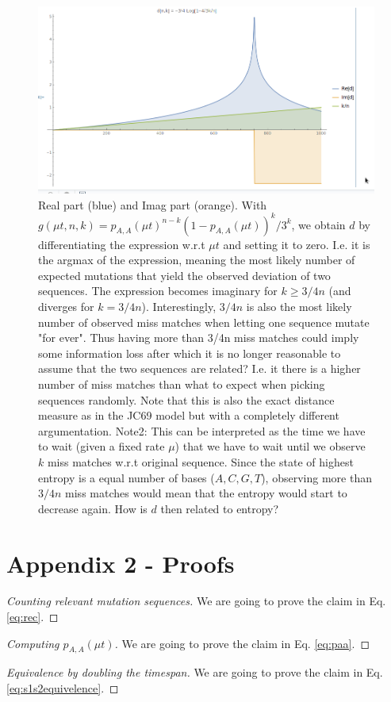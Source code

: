 \documentclass[12pt]{article}
\begin{document}
\begin{figure}
	\centering
	\includegraphics[width=1.0\linewidth]{Screenshot_20181205_140634}
	\caption{Real part (blue) and Imag part (orange). With $g(\mu t,n,k) = p_{A,A}(\mu t)^{n-k} (1-p_{A,A}(\mu t))^k/3^k$, we obtain $d$ by differentiating the expression w.r.t $\mu t$ and setting it to zero. I.e. it is the argmax of the expression, meaning the most likely number of expected mutations that yield the observed deviation of two sequences. The expression becomes imaginary for $k\geq 3/4n$ (and diverges for $k=3/4n$). Interestingly, $3/4n$ is also the most likely number of observed miss matches when letting one sequence mutate "for ever". Thus having more than 3/4n miss matches could imply some information loss after which it is no longer reasonable to assume that the two sequences are related? I.e. it there is a higher number of miss matches than what to expect when picking sequences randomly. {\color{red}Note that this is also the exact distance measure as in the JC69 model but with a completely different argumentation.}
	Note2: This can be interpreted as the time we have to wait (given a fixed rate $\mu$) that we have to wait until we observe $k$ miss matches w.r.t original sequence. Since the state of highest entropy is a equal number of bases ($A,C,G,T$), observing more than $3/4n$ miss matches would mean that the entropy would start to decrease again. How is $d$ then related to entropy? }
	\label{fig:distancemeasure}
\end{figure}
\FloatBarrier
\section{Appendix 2 - Proofs}
\begin{proof}[Counting relevant mutation sequences]
	We are going to prove the claim in Eq. \eqref{eq:rec}. 
\end{proof}
\begin{proof}[Computing $p_{A,A}(\mu t)$]
	We are going to prove the claim in Eq. \eqref{eq:paa}.
\end{proof}

\begin{proof}[Equivalence by doubling the timespan]
	We are going to prove the claim in Eq. \eqref{eq:s1s2equivelence}.
	
\end{proof}
\end{document}
